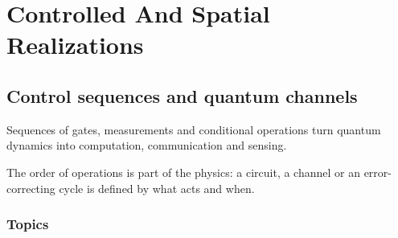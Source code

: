 \documentclass[11pt,oneside]{book}
\begin{document}
\part{Controlled And Spatial Realizations}

\chapter{Control sequences and quantum channels}

\begin{claimbox}

Sequences of gates, measurements and conditional operations turn quantum dynamics into computation, communication and sensing.

\end{claimbox}

The order of operations is part of the physics: a circuit, a channel or an error-correcting cycle is defined by what acts and when.

\section*{Topics}
\end{document}
